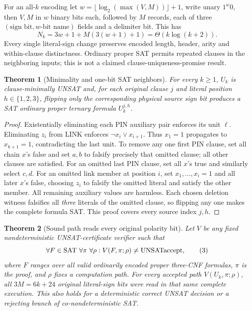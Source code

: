 \documentclass[11pt]{article}
\newtheorem{theorem}{Theorem}
\begin{document}
For an all-\(k\) encoding let \(w=\lfloor\log_2(\max(V,M))\rfloor+1\), write unary \(1^w0\), then \(V,M\) in \(w\) binary bits each, followed by \(M\) records, each of three \((\text{sign bit},w\text{-bit name})\) fields and a delimiter bit. This has
\[
N_k=3w+1+M(3(w+1)+1)=\Theta(k\log(k+2)). \tag{2}
\]
Every single literal-sign change preserves encoded length, header, arity and within-clause distinctness. Ordinary proper SAT permits repeated clauses in the neighboring inputs; this is not a claimed clause-uniqueness-promise result.

\begin{theorem}[Minimality and one-bit SAT neighbors]\label{th:min}
For every \(k\ge1\), \(U_k\) is clause-minimally UNSAT and, for each original clause \(j\) and literal position \(h\in\{1,2,3\}\), flipping only the corresponding physical source sign bit produces a SAT ordinary proper ternary formula \(U_k^{j,h}\).
\end{theorem}
\begin{proof}
Existentially eliminating each PIN auxiliary pair enforces its unit \(\ell\). Eliminating \(z_i\) from LINK enforces \(\neg x_i\vee x_{i+1}\). Thus \(x_1=1\) propagates to \(x_{k+1}=1\), contradicting the last unit. To remove any one first PIN clause, set all chain \(x\)'s false and set \(a,b\) to falsify precisely that omitted clause; all other clauses are satisfied. For an omitted last PIN clause, set all \(x\)'s true and similarly select \(c,d\). For an omitted link member at position \(i\), set \(x_1,\ldots,x_i=1\) and all later \(x\)'s false, choosing \(z_i\) to falsify the omitted literal and satisfy the other member. All remaining auxiliary values are harmless. Each chosen deletion witness falsifies all \emph{three} literals of the omitted clause, so flipping any one makes the complete formula SAT. This proof covers every source index \(j,h\).
\end{proof}
\begin{theorem}[Sound path reads every original polarity bit]\label{th:probe}
Let \(V\) be any fixed nondeterministic UNSAT-certificate verifier such that
\[
\forall F\in{\rm SAT}\ \forall\pi\ \forall\rho:
 V(F,\pi;\rho)\ne{\rm UNSATaccept}, \tag{3}
\]
where \(F\) ranges over all valid ordinarily encoded proper three-CNF formulas, \(\pi\) is the proof, and \(\rho\) fixes a computation path. For every accepted path \(V(U_k,\pi;\rho)\), all \(3M=6k+24\) original literal-sign bits were read in that same complete execution. This also holds for a deterministic correct UNSAT decision or a rejecting branch of co-nondeterministic SAT.
\end{theorem}
\end{document}
